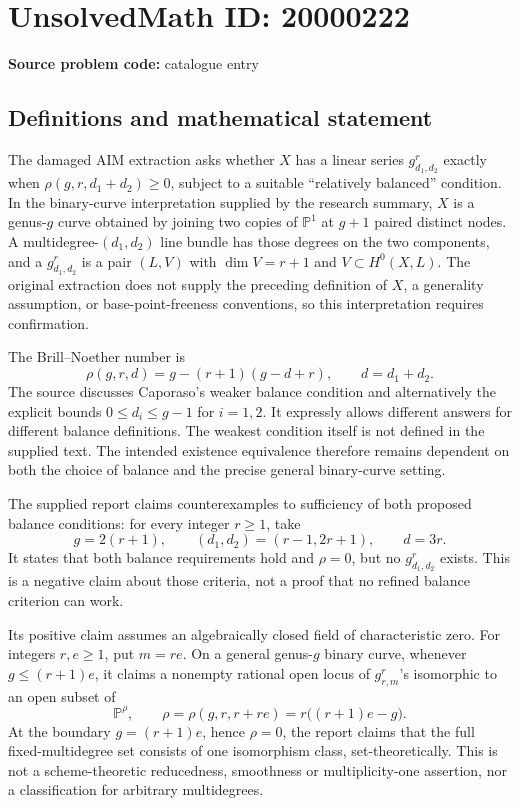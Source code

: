 \documentclass[11pt]{article}
\newcommand{\PP}{\mathbb{P}}
\begin{document}
\section*{UnsolvedMath ID: 20000222}
\textbf{Source problem code:} catalogue entry
\subsection{Definitions and mathematical statement}
The damaged AIM extraction asks whether $X$ has a linear series $g^r_{d_1,d_2}$ exactly when $\rho(g,r,d_1+d_2)\geq0$, subject to a suitable ``relatively balanced'' condition. In the binary-curve interpretation supplied by the research summary, $X$ is a genus-$g$ curve obtained by joining two copies of $\PP^1$ at $g+1$ paired distinct nodes. A multidegree-$(d_1,d_2)$ line bundle has those degrees on the two components, and a $g^r_{d_1,d_2}$ is a pair $(L,V)$ with $\dim V=r+1$ and $V\subset H^0(X,L)$. The original extraction does not supply the preceding definition of $X$, a generality assumption, or base-point-freeness conventions, so this interpretation requires confirmation.

The Brill--Noether number is
\[
 \rho(g,r,d)=g-(r+1)(g-d+r),\qquad d=d_1+d_2.
\]
The source discusses Caporaso's weaker balance condition and alternatively the explicit bounds $0\leq d_i\leq g-1$ for $i=1,2$. It expressly allows different answers for different balance definitions. The weakest condition itself is not defined in the supplied text. The intended existence equivalence therefore remains dependent on both the choice of balance and the precise general binary-curve setting.

The supplied report claims counterexamples to sufficiency of both proposed balance conditions: for every integer $r\geq1$, take
\[
 g=2(r+1),\qquad(d_1,d_2)=(r-1,2r+1),\qquad d=3r.
\]
It states that both balance requirements hold and $\rho=0$, but no $g^r_{d_1,d_2}$ exists. This is a negative claim about those criteria, not a proof that no refined balance criterion can work.

Its positive claim assumes an algebraically closed field of characteristic zero. For integers $r,e\geq1$, put $m=re$. On a general genus-$g$ binary curve, whenever $g\leq(r+1)e$, it claims a nonempty rational open locus of $g^r_{r,m}$'s isomorphic to an open subset of
\[
 \PP^{\rho},\qquad \rho=\rho(g,r,r+re)=r\bigl((r+1)e-g\bigr).
\]
At the boundary $g=(r+1)e$, hence $\rho=0$, the report claims that the full fixed-multidegree set consists of one isomorphism class, set-theoretically. This is not a scheme-theoretic reducedness, smoothness or multiplicity-one assertion, nor a classification for arbitrary multidegrees.
\end{document}
